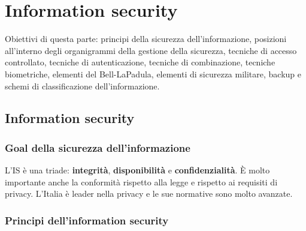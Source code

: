 \part{Information security}
Obiettivi di questa parte:
principi della sicurezza dell'informazione, posizioni all'interno
degli organigrammi della gestione della sicurezza, tecniche di accesso
controllato, tecniche di autenticazione, tecniche di combinazione,
tecniche biometriche, elementi del Bell-LaPadula, elementi di sicurezza
militare, backup e schemi di classificazione dell'informazione.

\chapter{Information security}

\section{Goal della sicurezza dell'informazione}

L'IS è una triade: \textbf{integrità}, \textbf{disponibilità} e
\textbf{confidenzialità}. È molto importante anche la conformità rispetto alla
legge e rispetto ai requisiti di privacy. L'Italia è leader nella privacy e le
sue normative sono molto avanzate.


\section{Principi dell'information security}


